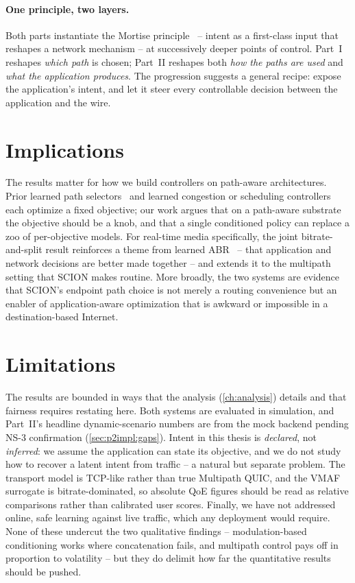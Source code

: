 \paragraph{One principle, two layers.} Both parts instantiate the Mortise principle~\cite{Shen2026} --
intent as a first-class input that reshapes a network mechanism -- at successively deeper points of control.
Part~I reshapes \emph{which path} is chosen; Part~II reshapes both \emph{how the paths are used} and
\emph{what the application produces}. The progression suggests a general recipe: expose the application's
intent, and let it steer every controllable decision between the application and the wire.

\section{Implications}
\label{sec:disc:implications}

The results matter for how we build controllers on path-aware architectures. Prior learned path
selectors~\cite{Bourak2025} and learned congestion or scheduling controllers~\cite{Jay2019, Zhang2019,
Wu2020} each optimize a fixed objective; our work argues that on a path-aware substrate the objective should
be a knob, and that a single conditioned policy can replace a zoo of per-objective models. For real-time
media specifically, the joint bitrate-and-split result reinforces a theme from learned
ABR~\cite{Mao2017} -- that application and network decisions are better made together -- and extends it to
the multipath setting that SCION makes routine. More broadly, the two systems are evidence that SCION's
endpoint path choice is not merely a routing convenience but an enabler of application-aware optimization
that is awkward or impossible in a destination-based Internet.

\section{Limitations}
\label{sec:disc:limitations}

The results are bounded in ways that the analysis (\cref{ch:analysis}) details and that fairness requires
restating here. Both systems are evaluated in simulation, and Part~II's headline dynamic-scenario numbers
are from the mock backend pending NS-3 confirmation (\cref{sec:p2impl:gaps}). Intent in this thesis is
\emph{declared}, not \emph{inferred}: we assume the application can state its objective, and we do not study
how to recover a latent intent from traffic -- a natural but separate problem. The transport model is
TCP-like rather than true Multipath QUIC, and the VMAF surrogate is bitrate-dominated, so absolute QoE
figures should be read as relative comparisons rather than calibrated user scores. Finally, we have not
addressed online, safe learning against live traffic, which any deployment would require. None of these
undercut the two qualitative findings -- modulation-based conditioning works where concatenation fails, and
multipath control pays off in proportion to volatility -- but they do delimit how far the quantitative
results should be pushed.
